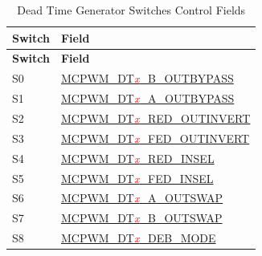 \begin{longtable}[c]{ |p{4cm}|p{6cm}| }
    \caption{Dead Time Generator Switches Control Fields}
    \label{tab:mcpwm-s-dt}
    \\\hline
    \rowcolor{lightgray}
    \textbf{Switch}
    & \textbf{Field}
    \\\hline
    \endfirsthead
    \hline
    \rowcolor{lightgray}   
    \textbf{Switch}
    & \textbf{Field}
    \\\hline
    \endhead
    \hline
    \endfoot
    S0
    & \hyperref[fielddesc:MCPWMDT0BOUTBYPASS]{MCPWM\_DT\textcolor{red}{\it{x}}\_B\_OUTBYPASS}
    \\\hline
    S1
    & \hyperref[fielddesc:MCPWMDT0AOUTBYPASS]{MCPWM\_DT\textcolor{red}{\it{x}}\_A\_OUTBYPASS}
    \\\hline
    S2
    & \hyperref[fielddesc:MCPWMDT0REDOUTINVERT]{MCPWM\_DT\textcolor{red}{\it{x}}\_RED\_OUTINVERT}
    \\\hline
    S3
    & \hyperref[fielddesc:MCPWMDT0FEDOUTINVERT]{MCPWM\_DT\textcolor{red}{\it{x}}\_FED\_OUTINVERT}
    \\\hline
    S4
    & \hyperref[fielddesc:MCPWMDT0REDINSEL]{MCPWM\_DT\textcolor{red}{\it{x}}\_RED\_INSEL}
    \\\hline
    S5
    & \hyperref[fielddesc:MCPWMDT0FEDINSEL]{MCPWM\_DT\textcolor{red}{\it{x}}\_FED\_INSEL}
    \\\hline
    S6
    & \hyperref[fielddesc:MCPWMDT0AOUTSWAP]{MCPWM\_DT\textcolor{red}{\it{x}}\_A\_OUTSWAP}
    \\\hline
    S7
    & \hyperref[fielddesc:MCPWMDT0BOUTSWAP]{MCPWM\_DT\textcolor{red}{\it{x}}\_B\_OUTSWAP}
    \\\hline
    S8
    & \hyperref[fielddesc:MCPWMDT0DEBMODE]{MCPWM\_DT\textcolor{red}{\it{x}}\_DEB\_MODE}
    \\\hline
\end{longtable}